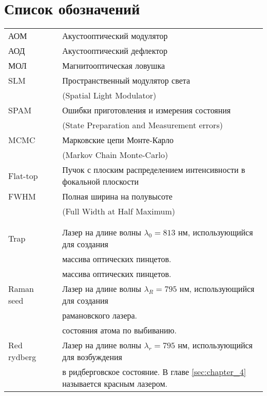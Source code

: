 

\section*{Список обозначений}

\begin{tabular}{lll}
	АОМ &    & Акустооптический модулятор \\
	АОД &    & Акустооптический дефлектор \\
	МОЛ &    & Магнитооптическая ловушка \\
	SLM &    & Пространственный модулятор света \\  
	& & (Spatial Light Modulator) \\
	SPAM &    & Ошибки приготовления и измерения состояния \\
	& & (State Preparation and Measurement errors) \\
	MCMC &    & Марковские цепи Монте-Карло \\
	& & (Markov Chain Monte-Carlo) \\
	Flat-top & & Пучок с плоским распределением интенсивности в фокальной плоскости \\
	FWHM & & Полная ширина на полувысоте \\
	& & (Full Width at Half Maximum) \\
	& & \\
	& & \\
	Trap &     & Лазер на длине волны $\lambda_0 = 813 \text{ нм}$, использующийся для создания \\
	&   & массива оптических пинцетов. \\
	&   & массива оптических пинцетов. \\
	Raman seed &     & Лазер на длине волны $\lambda_R = 795 \text{ нм}$, использующийся для создания \\
	& & рамановского лазера. \\
	& & состояния атома по выбиванию. \\
	Red rydberg &    & Лазер на длине волны $\lambda_r = 795 \text{ нм}$, использующийся для возбуждения \\ 
	& & в ридберговское состояние. В главе \ref{sec:chapter_4} называется красным лазером.\\

\end{tabular}
